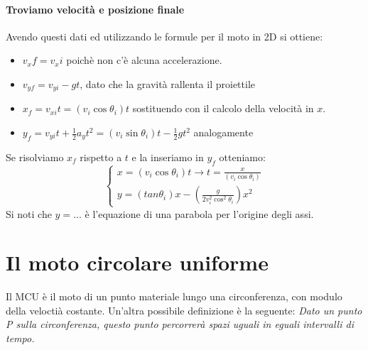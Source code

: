 \documentclass[12pt, a4paper, openany]{book}
\begin{document}
\paragraph*{Troviamo velocità e posizione finale}
Avendo questi dati ed utilizzando le formule per il moto in 2D si ottiene:
\begin{itemize}
    \item $v_xf = v_xi$ poichè non c'è alcuna accelerazione.
    \item $v_{yf} = v_{yi} - gt$, dato che la gravità rallenta il proiettile
\end{itemize}
\begin{itemize}
    \item $x_f = v_{xi}t = (v_i \cos \theta_i) t$ sostituendo con il calcolo della velocità in $x$.
    \item $y_f = v_{yi}t + \frac{1}{2} a_yt^2 = (v_i \sin \theta_i)t - \frac{1}{2} gt^2$ analogamente
\end{itemize}
Se risolviamo $x_f$ rispetto a $t$ e la inseriamo in $y_f$ otteniamo:
\[
\begin{cases}
    x = (v_i \cos \theta_i) t \to t = \frac{x}{(v_i \cos \theta_i)} \\
    y = (tan \theta_i) x- (\frac{g}{2v_i^2\cos^2 \theta_i})x^2
\end{cases}
\]
Si noti che $y=...$ è l'equazione di una parabola per l'origine degli assi.


\section*{Il moto circolare uniforme}
Il MCU è il moto di un punto materiale lungo una circonferenza, con modulo della veloctià costante.
Un'altra possibile definizione è la seguente: \emph{Dato un punto P sulla circonferenza, questo punto percorrerà spazi uguali in eguali intervalli di tempo.}
\end{document}
